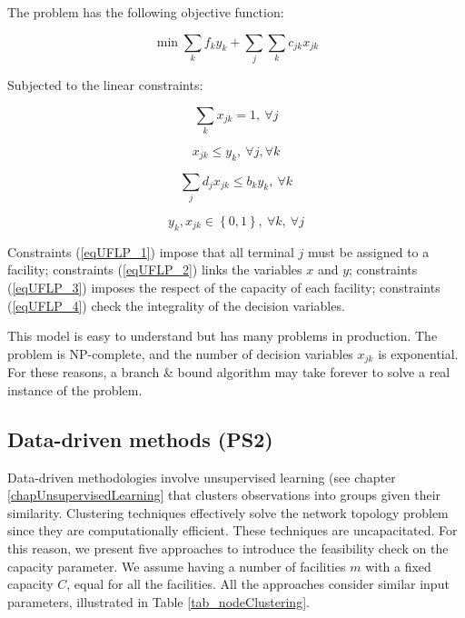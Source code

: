 The problem has the following objective function:

\begin{equation}
    \min{\sum_{k}{f_ky_k+\sum_{j}\sum_{k} c_{jk}}}x_{jk}
\end{equation}

Subjected to the linear constraints:

\begin{equation}
    \sum_{k} x_{jk}=1,\ \forall j
    \label{eqUFLP_1}
\end{equation}

\begin{equation}
    x_{jk}\le y_k,\ \forall j,\forall k
    \label{eqUFLP_2}
\end{equation}

\begin{equation}
    \sum_{j}{d_jx_{jk}\le b_ky_k},\ \forall k
    \label{eqUFLP_3}
\end{equation}

\begin{equation}
    y_k,x_{jk}\in\left\{0,1\right\},\ \forall k,\ \forall j
    \label{eqUFLP_4}
\end{equation}

Constraints (\ref{eqUFLP_1}) impose that all terminal $j$ must be assigned to a facility; constraints (\ref{eqUFLP_2}) links the variables $x$ and $y$; constraints (\ref{eqUFLP_3}) imposes the respect of the capacity of each facility; constraints (\ref{eqUFLP_4}) check the integrality of the decision variables.\par

This model is easy to understand but has many problems in production. The problem is NP-complete, and the number of decision variables $x_{jk}$ is exponential. For these reasons, a branch \& bound algorithm may take forever to solve a real instance of the problem. 

\subsection{Data-driven methods (PS2)}

Data-driven methodologies involve unsupervised learning (see chapter \ref{chapUnsupervisedLearning} that clusters observations into groups given their similarity. Clustering techniques effectively solve the network topology problem since they are computationally efficient. These techniques are uncapacitated. For this reason, we present five approaches to introduce the feasibility check on the capacity parameter. We assume having a number of facilities $m$ with a fixed capacity $C$, equal for all the facilities. All the approaches consider similar input parameters, illustrated in Table \ref{tab_nodeClustering}.

